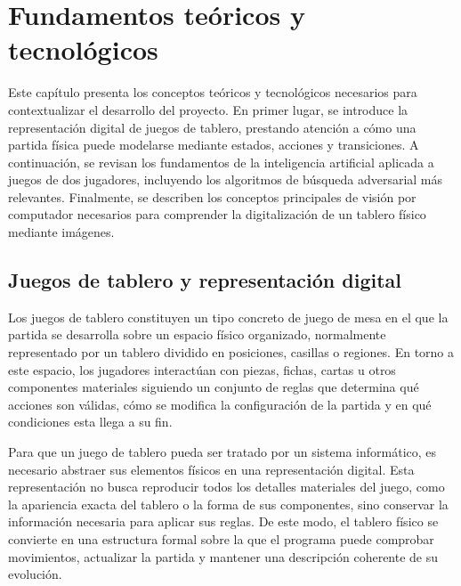 \chapter{Fundamentos teóricos y tecnológicos}
\label{chap:fundamentos-teoricos-tecnologicos}

Este capítulo presenta los conceptos teóricos y tecnológicos necesarios para contextualizar el desarrollo del proyecto. En primer lugar, se introduce la representación digital de juegos de tablero, prestando atención a cómo una partida física puede modelarse mediante estados, acciones y transiciones. A continuación, se revisan los fundamentos de la inteligencia artificial aplicada a juegos de dos jugadores, incluyendo los algoritmos de búsqueda adversarial más relevantes. Finalmente, se describen los conceptos principales de visión por computador necesarios para comprender la digitalización de un tablero físico mediante imágenes.

\section{Juegos de tablero y representación digital}
\label{sec:juegos-tablero-representacion-digital}

Los juegos de tablero constituyen un tipo concreto de juego de mesa en el que la partida se desarrolla sobre un espacio físico organizado, normalmente representado por un tablero dividido en posiciones, casillas o regiones. En torno a este espacio, los jugadores interactúan con piezas, fichas, cartas u otros componentes materiales siguiendo un conjunto de reglas que determina qué acciones son válidas, cómo se modifica la configuración de la partida y en qué condiciones esta llega a su fin.

Para que un juego de tablero pueda ser tratado por un sistema informático, es necesario abstraer sus elementos físicos en una representación digital. Esta representación no busca reproducir todos los detalles materiales del juego, como la apariencia exacta del tablero o la forma de sus componentes, sino conservar la información necesaria para aplicar sus reglas. De este modo, el tablero físico se convierte en una estructura formal sobre la que el programa puede comprobar movimientos, actualizar la partida y mantener una descripción coherente de su evolución.

